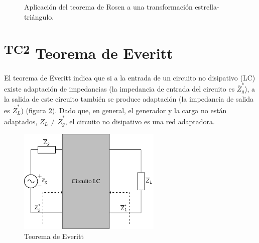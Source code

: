 \begin{figure}[H]
  \centering
  \hspace{2cm}
  \caption{Aplicación del teorema de Rosen a una transformación estrella-triángulo.}
  \label{fig:teorema-rosen-aplicacion}
\end{figure}

\section{\textsuperscript{TC2} Teorema de Everitt}
\label{sec:org68c10d8}

El teorema de Everitt indica que si a la entrada de un circuito no disipativo (LC) existe adaptación de impedancias (la impedancia de entrada del circuito es $\overline{Z}_g^*$), a la salida de este circuito también se produce adaptación (la impedancia de salida es $\overline{Z}_L^*$) (figura \ref{fig:teorema-everitt}). Dado que, en general, el generador y la carga no están adaptados, $\overline{Z}_L \neq \overline{Z}^*_g$, el circuito no disipativo es una red adaptadora.

\begin{figure}[H]
  \centering
  \includegraphics[height=5cm]{../figs/Everitt.pdf}
  \caption{Teorema de Everitt}
  \label{fig:teorema-everitt}
\end{figure}


